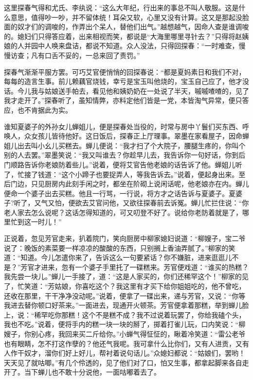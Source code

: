 \documentclass[12pt,oneside]{book}
\begin{document}
这里探春气得和尤氏、李纨说：“这么大年纪，行出来的事总不叫人敬服。这是什么意思，值得吵一吵，并不留体统！耳朵又软，心里又没有计算。这又是那起没脸面的奴才们的调唆的，作弄出个呆人，替他们出气。”越想越气，因命人查是谁调唆的。媳妇们只得答应着，出来相视而笑，都说是“大海里哪里寻针去？”只得将赵姨娘的人并园中人唤来盘诘，都说不知道。众人没法，只得回探春：“一时难查，慢慢访查；凡有口舌不妥的，一总来回了责罚。”

探春气渐渐平服方罢。可巧艾官便悄悄的回探春说：“都是夏妈素日和我们不对，每每的造言生事。前儿赖藕官烧钱，幸亏是宝玉叫他烧的，宝玉自己应了，他才没话。今儿我与姑娘送手帕去，看见他和姨奶奶在一处说了半天，嘁嘁喳喳的，见了我才走开了。”探春听了，虽知情弊，亦料定他们皆是一党，本皆淘气异常，便只答应，也不肯据此为实。

谁知夏婆子的外孙女儿蝉姐儿，便是探春处当役的，时常与房中丫鬟们买东西、呼唤人，众女孩儿皆待他好。这日饭后，探春正上厅理事。翠墨在家看屋子，因命蝉姐儿出去叫小幺儿买糕去。蝉儿便说：“我才扫了个大院子，腰腿生疼的，你叫个别的人去罢。”翠墨笑说：“我又叫谁去？你趁早儿去，我告诉你一句好话，你到后门顺路告诉你老娘防着些儿。”说着，便将艾官告他老娘的话告诉了他。蝉姐儿听了，忙接了钱道：“这个小蹄子也要捉弄人，等我告诉去。”说着，便起身出来。至后门边，只见厨房内此刻手闲之时，都坐在阶砌上说闲话呢，他老娘亦在内。蝉儿便命一个婆子出去买糕。他且一行骂，一行说，将方才之话告诉与夏婆子。夏婆子?听了，又气又怕，便欲去艾官问他，又欲往探春前去诉冤。蝉儿忙拦住说：“你老人家去怎么说呢？这话怎得知道的，可又叨登不好了。说给你老防着就是了，哪里忙到这一时儿！”

正说着，忽见芳官走来，扒着院门，笑向厨房中柳家媳妇说道：“柳嫂子，宝二爷说了：晚饭的素菜要一样凉凉的酸酸的东西，只别搁上香油弄腻了。”柳家的笑道：“知道。今儿怎遣你来了，告诉这么一句要紧话？你不嫌脏，进来逛逛儿不是？”芳官才进来，忽有一个婆子手里托了一碟糕来。芳官便戏道：“谁买的热糕？我先尝一块儿。”蝉儿一手接了，道：“这是人家买的，你们还稀罕这个！”柳家的见了，忙笑道：“芳姑娘，你喜吃这个？我这里有才买下给你姐姐吃的，他不曾吃，还收在那里，干干净净没动呢。”说着，便拿了一碟出来，递与芳官，又说：“你等我进去替你顿口好茶来。”一面进去，现通开火顿茶。芳官便拿着那糕，举到蝉儿脸上，说：“稀罕吃你那糕！这个不是糕不成？我不过说着玩罢了，你给我磕个头，我也不吃。”说着，便将手内的糕一块一块的掰了，掷着打雀儿玩，口内笑说：“柳嫂子，你别心疼，我回来买二斤给你。”小蝉气得怔怔的，瞅着冷笑道：“雷公老爷也有眼睛，怎不打这作孽的？他还气我呢。我可拿什么比你们，又有人进贡，又有人作干奴才，溜你们好上好儿，帮衬着说句话儿。”众媳妇都说：“姑娘们，罢哟！天天见了就咕唧。”有几个伶透的，见了他们对了口，怕又生事，都拿起脚来各自走开了。当下蝉儿也不敢十分说他，一面咕嘟着去了。
\end{document}
